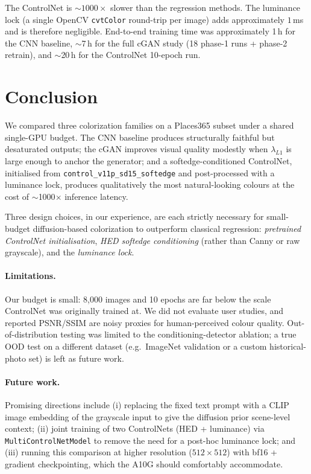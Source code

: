 \documentclass[conference]{IEEEtran}
\begin{document}
The ControlNet is $\sim$$1000\times$ slower than the regression
methods. The luminance lock (a single OpenCV \texttt{cvtColor}
round-trip per image) adds approximately $1$\,ms and is therefore
negligible. End-to-end training time was approximately 1\,h for the
CNN baseline, $\sim$7\,h for the full cGAN study (18 phase-1 runs +
phase-2 retrain), and $\sim$20\,h for the ControlNet 10-epoch run.

\section{Conclusion}\label{sec:conclusion}

We compared three colorization families on a Places365 subset under a
shared single-GPU budget. The CNN baseline produces structurally
faithful but desaturated outputs; the cGAN improves visual quality
modestly when $\lambda_{L1}$ is large enough to anchor the generator;
and a softedge-conditioned ControlNet, initialised from
\texttt{control\_v11p\_sd15\_softedge} and post-processed with a
luminance lock, produces qualitatively the most natural-looking
colours at the cost of $\sim$1000$\times$ inference latency.

Three design choices, in our experience, are each strictly necessary
for small-budget diffusion-based colorization to outperform classical
regression: \emph{pretrained ControlNet initialisation}, \emph{HED
softedge conditioning} (rather than Canny or raw grayscale), and the
\emph{luminance lock}.

\paragraph{Limitations.} Our budget is small: 8{,}000 images and 10
epochs are far below the scale ControlNet was originally trained at.
We did not evaluate user studies, and reported PSNR/SSIM are noisy
proxies for human-perceived colour quality. Out-of-distribution
testing was limited to the conditioning-detector ablation; a true OOD
test on a different dataset (e.g.\ ImageNet validation or a custom
historical-photo set) is left as future work.

\paragraph{Future work.} Promising directions include (i) replacing
the fixed text prompt with a CLIP image embedding of the grayscale
input to give the diffusion prior scene-level context; (ii) joint
training of two ControlNets (HED + luminance) via
\texttt{MultiControlNetModel} to remove the need for a post-hoc
luminance lock; and (iii) running this comparison at higher resolution
($512\times512$) with bf16 + gradient checkpointing, which the A10G
should comfortably accommodate.
\end{document}
